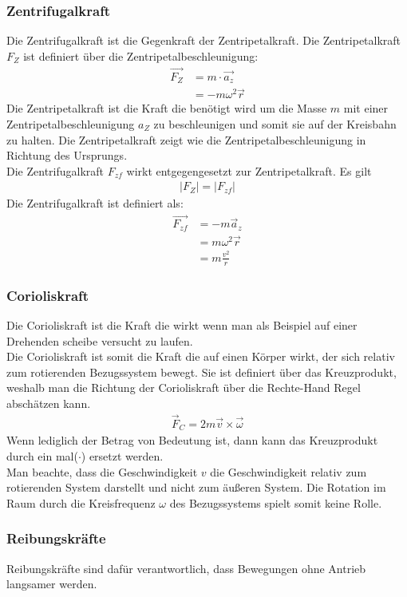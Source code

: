 \documentclass{article}
\begin{document}
\subsubsection*{Zentrifugalkraft}
Die Zentrifugalkraft ist die Gegenkraft der Zentripetalkraft. Die Zentripetalkraft $F_Z$ ist definiert über die 
Zentripetalbeschleunigung:
\begin{align}
    \vec{F_Z}&=m\cdot \vec{a_z}\\
    &=-m\omega^2\vec{r}
\end{align}
Die Zentripetalkraft ist die Kraft die benötigt wird um die Masse $m$ mit einer Zentripetalbeschleunigung $a_Z$  zu beschleunigen und somit 
sie auf der Kreisbahn zu halten. Die Zentripetalkraft zeigt wie die Zentripetalbeschleunigung in Richtung des Ursprungs.\\
Die Zentrifugalkraft $F_{zf}$ wirkt entgegengesetzt zur Zentripetalkraft. Es gilt
\begin{align}
    |F_Z|=|F_{zf}|
\end{align}
Die Zentrifugalkraft ist definiert als:
\begin{align}
    \vec{F_{zf}}&=-m\vec{a}_z\\
    &=m\omega^2\vec{r}\\
    &=m\frac{v^2}{r}
\end{align}

\subsubsection*{Corioliskraft}
Die Corioliskraft ist die Kraft die wirkt wenn man als Beispiel auf einer Drehenden scheibe versucht zu laufen.\\
Die Corioliskraft ist somit die Kraft die auf einen Körper wirkt, der sich relativ zum rotierenden Bezugssystem bewegt.
Sie ist definiert über das Kreuzprodukt, weshalb man die Richtung der Corioliskraft über die Rechte-Hand Regel abschätzen kann.
\begin{align}
    \vec{F}_C=2m\vec{v}\times\vec{\omega}
\end{align}
Wenn lediglich der Betrag von Bedeutung ist, dann kann das Kreuzprodukt durch ein mal($\cdot$) ersetzt werden. \\
Man beachte, dass die Geschwindigkeit $v$ die Geschwindigkeit relativ zum rotierenden System darstellt und nicht zum äußeren System.
Die Rotation im Raum durch die Kreisfrequenz $\omega$ des Bezugssystems spielt somit keine Rolle.

\subsubsection{Reibungskräfte}
Reibungskräfte sind dafür verantwortlich, dass Bewegungen ohne Antrieb langsamer werden.
\end{document}
